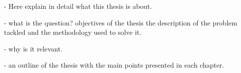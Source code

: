 - Here explain in detail what this thesis is about.

- what is the question? objectives of the thesis
the description of the problem tackled and the methodology used to solve
it.

- why is it relevant.

- an outline of the thesis with the main points presented in each chapter.